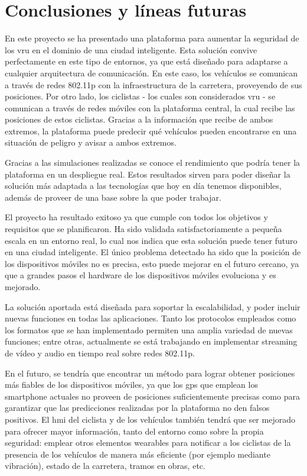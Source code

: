 \chapter{Conclusiones y líneas futuras}
En este proyecto se ha presentado una plataforma para aumentar la seguridad de
los \gls{vru} en el dominio de una ciudad inteligente. Esta solución convive
perfectamente en este tipo de entornos, ya que está diseñado para adaptarse a
cualquier arquitectura de comunicación. En este caso, los vehículos se
comunican a través de redes \gls{802.11p} con la infraestructura de la
carretera, proveyendo de sus posiciones. Por otro lado, los ciclistas - los
cuales son considerados \gls{vru} - se comunican a través de redes móviles con
la plataforma central, la cual recibe las posiciones de estos ciclistas.
Gracias a la información que recibe de ambos extremos, la plataforma puede
predecir qué vehículos pueden encontrarse en una situación de peligro y avisar
a ambos extremos.

Gracias a las simulaciones realizadas se conoce el rendimiento que podría tener
la plataforma en un despliegue real. Estos resultados sirven para poder diseñar
la solución más adaptada a las tecnologías que hoy en día tenemos disponibles,
además de proveer de una base sobre la que poder trabajar.

El proyecto ha resultado exitoso ya que cumple con todos los objetivos y
requisitos que se planificaron. Ha sido validada satisfactoriamente a pequeña
escala en un entorno real, lo cual nos indica que esta solución puede tener
futuro en una ciudad inteligente. El único problema detectado ha sido que la
posición de los dispositivos móviles no es precisa, esto puede mejorar en el
futuro cercano, ya que a grandes pasos el hardware de los dispositivos móviles
evoluciona y es mejorado.

La solución aportada está diseñada para soportar la escalabilidad, y poder
incluir nuevas funciones en todas las aplicaciones. Tanto los protocolos
empleados como los formatos que se han implementado permiten una amplia
variedad de nuevas funciones; entre otras, actualmente se está trabajando en
implementar streaming de vídeo y audio en tiempo real sobre redes \gls{802.11p}.

En el futuro, se tendría que encontrar un método para lograr obtener posiciones
más fiables de los dispositivos móviles, ya que los \gls{gps} que emplean los
smartphone actuales no proveen de posiciones suficientemente precisas como para
garantizar que las predicciones realizadas por la plataforma no den falsos
positivos. El \gls{hmi} del ciclista y de los vehículos también tendrá que ser
mejorado para ofrecer mayor información, tanto del entorno como sobre la propia
seguridad: emplear otros elementos wearables para notificar a los ciclistas de
la presencia de los vehículos de manera más eficiente (por ejemplo mediante
vibración), estado de la carretera, tramos en obras, etc.

